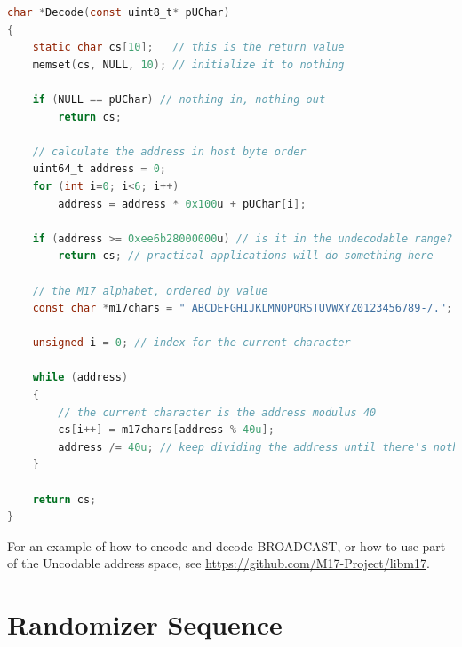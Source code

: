 \documentclass[a4paper,11pt,oneside]{book}
\begin{document}
\begin{lstlisting}[language=C,numbers=none]
char *Decode(const uint8_t* pUChar)
{
	static char cs[10];	  // this is the return value
	memset(cs, NULL, 10); // initialize it to nothing

	if (NULL == pUChar) // nothing in, nothing out
		return cs;

	// calculate the address in host byte order
	uint64_t address = 0;
	for (int i=0; i<6; i++)
		address = address * 0x100u + pUChar[i];

	if (address >= 0xee6b28000000u) // is it in the undecodable range?
		return cs; // practical applications will do something here

	// the M17 alphabet, ordered by value
	const char *m17chars = " ABCDEFGHIJKLMNOPQRSTUVWXYZ0123456789-/.";

	unsigned i = 0; // index for the current character

	while (address)
	{
		// the current character is the address modulus 40
		cs[i++] = m17chars[address % 40u];
		address /= 40u; // keep dividing the address until there's nothing left
	}

	return cs;
}
\end{lstlisting}

For an example of how to encode and decode BROADCAST, or how to use part of the Uncodable address space,
see \href{https://github.com/M17-Project/libm17}{https://github.com/M17-Project/libm17}.

\chapter{Randomizer Sequence}
\end{document}
